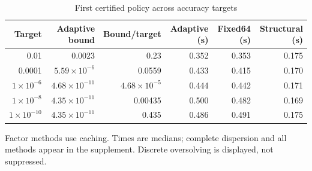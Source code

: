 \begin{table}[htbp]
\centering\small\setlength{\tabcolsep}{5pt}
\caption{First certified policy across accuracy targets}\label{tab:r39accuracy}
\begin{tabular}{rrrrrr}
\toprule
Target & Adaptive bound & Bound/target & Adaptive (s) & Fixed64 (s) & Structural (s)\\
\midrule
0.01 & 0.0023 & 0.23 & 0.352 & 0.353 & 0.175\\
0.0001 & $5.59\times10^{-6}$ & 0.0559 & 0.433 & 0.415 & 0.170\\
$1\times10^{-6}$ & $4.68\times10^{-11}$ & $4.68\times10^{-5}$ & 0.444 & 0.442 & 0.171\\
$1\times10^{-8}$ & $4.35\times10^{-11}$ & 0.00435 & 0.500 & 0.482 & 0.169\\
$1\times10^{-10}$ & $4.35\times10^{-11}$ & 0.435 & 0.486 & 0.491 & 0.175\\
\bottomrule
\end{tabular}
\par\smallskip\begin{minipage}{.96\linewidth}\footnotesize Factor methods use caching. Times are medians; complete dispersion and all methods appear in the supplement. Discrete oversolving is displayed, not suppressed.\end{minipage}
\end{table}
